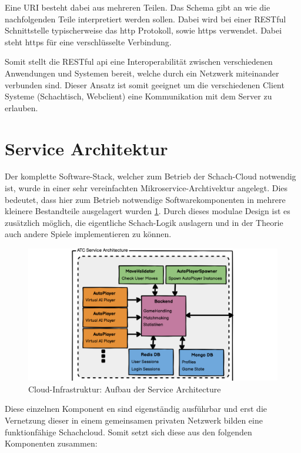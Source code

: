 Eine URI besteht dabei aus mehreren Teilen. Das Schema gibt an wie die
nachfolgenden Teile interpretiert werden sollen. Dabei wird bei einer
RESTful Schnittstelle typischerweise das \gls{http} Protokoll, sowie
\gls{https} verwendet. Dabei steht \gls{https} für eine verschlüsselte
Verbindung.

Somit stellt die RESTful \gls{api} eine Interoperabilität zwischen
verschiedenen Anwendungen und Systemen bereit, welche durch ein Netzwerk
miteinander verbunden sind. Dieser Ansatz ist somit geeignet um die
verschiedenen Client Systeme (Schachtisch, Webclient) eine Kommunikation
mit dem Server zu erlauben.

\hypertarget{service-architektur}{%
\section{Service Architektur}\label{service-architektur}}

Der komplette Software-Stack, welcher zum Betrieb der Schach-Cloud
notwendig ist, wurde in einer sehr vereinfachten
Mikroservice-Archtivektur angelegt. Dies bedeutet, dass hier zum Betrieb
notwendige Softwarekomponenten in mehrere kleinere Bestandteile
ausgelagert wurden \ref{ATC_Service_Architecture}. Durch dieses modulae
Design ist es zusätzlich möglich, die eigentliche Schach-Logik auslagern
und in der Theorie auch andere Spiele implementieren zu können.

\begin{figure}
\centering
\includegraphics{images/ATC_Service_Architecture.png}
\caption{Cloud-Infrastruktur: Aufbau der Service Architecture
\label{ATC_Service_Architecture}}
\end{figure}

Diese einzelnen Komponent en sind eigenständig ausführbar und erst die
Vernetzung dieser in einem gemeinsamen privaten Netzwerk bilden eine
funktionfähige Schachcloud. Somit setzt sich diese aus den folgenden
Komponenten zusammen:

